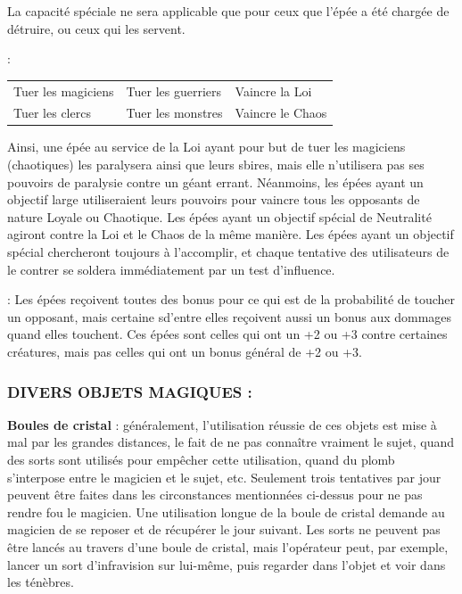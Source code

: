 {\bigskip

La capacité spéciale ne sera applicable que pour ceux que l'épée a été chargée de détruire, ou ceux qui les servent.

:

\medskip

{\parindent1.5cm\begin{tabular}{p{4.6cm}p{4.6cm}p{4.6cm}}
Tuer les magiciens & Tuer les guerriers & Vaincre la Loi \\
Tuer les clercs & Tuer les monstres & Vaincre le Chaos \\
\end{tabular}}

\bigskip

Ainsi, une épée au service de la Loi ayant pour but de tuer les magiciens (chaotiques) les paralysera ainsi que leurs sbires, mais elle n'utilisera pas ses pouvoirs de paralysie contre un géant errant. Néanmoins, les épées ayant un objectif large utiliseraient leurs pouvoirs pour vaincre tous les opposants de nature Loyale ou Chaotique. Les épées ayant un objectif spécial de Neutralité agiront contre la Loi et le Chaos de la même manière. Les épées ayant un objectif spécial chercheront toujours à l'accomplir, et chaque tentative des utilisateurs de le contrer se soldera immédiatement par un test d'influence.

\bigskip

 : Les épées reçoivent toutes des bonus pour ce qui est de la probabilité de toucher un opposant, mais certaine sd'entre elles reçoivent aussi un bonus aux dommages quand elles touchent. Ces épées sont celles qui ont un +2 ou +3 contre certaines créatures, mais pas celles qui ont un bonus général de +2 ou +3.



\subsubsection*{DIVERS OBJETS MAGIQUES :}

\label{objet-boule-cristal}\textbf{Boules de cristal} : généralement, l'utilisation réussie de ces objets est mise à mal par les grandes distances, le fait de ne pas connaître vraiment le sujet, quand des sorts sont utilisés pour empêcher cette utilisation, quand du plomb s'interpose entre le magicien et le sujet, etc. Seulement trois tentatives par jour peuvent être faites dans les circonstances mentionnées ci-dessus pour ne pas rendre fou le magicien. Une utilisation longue de la boule de cristal demande au magicien de se reposer et de récupérer le jour suivant. Les sorts ne peuvent pas être lancés au travers d'une boule de cristal, mais l'opérateur peut, par exemple, lancer un sort d'infravision sur lui-même, puis regarder dans l'objet et voir dans les ténèbres.

}

